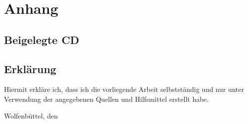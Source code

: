 \documentclass[
  a4paper,					    %
  twoside,
  DIV=calc,     				%
  bibliography=totoc,
  cleardoublepage=empty,
  ngerman,     					%
  final       					%
]{scrbook}
\begin{document}

\appendix
\part*{Anhang}









\backmatter



\chapter{Beigelegte CD}
\label{sec:BeigelegteCD}



\chapter{Erklärung}
\label{sec:Erklärung}
Hiermit erkläre ich, dass ich die vorliegende Arbeit selbstständig und nur unter Verwendung der angegebenen Quellen und Hilfsmittel erstellt habe.
\vspace{2.5cm} \par
Wolfenbüttel, den %


\glsaddall
\printglossaries


%
\nocite{*}
%
\begin{singlespace}

\end{singlespace}
\end{document}
